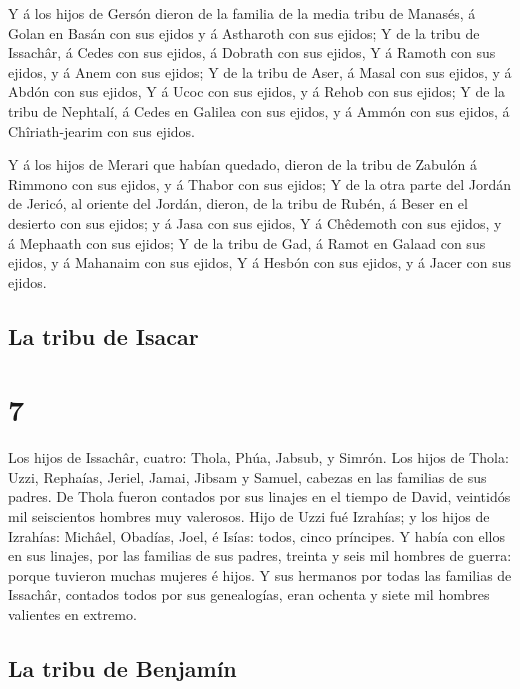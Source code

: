  Y á los hijos de Gersón dieron de la familia de la media
tribu de Manasés, á Golan en Basán con sus ejidos y á Astharoth con sus
ejidos;  Y de la tribu de Issachâr, á Cedes con sus
ejidos, á Dobrath con sus ejidos,  Y á Ramoth con sus
ejidos, y á Anem con sus ejidos;  Y de la tribu de Aser,
á Masal con sus ejidos, y á Abdón con sus ejidos,  Y á
Ucoc con sus ejidos, y á Rehob con sus ejidos;  Y de la
tribu de Nephtalí, á Cedes en Galilea con sus ejidos, y á Ammón con sus
ejidos, á Chîriath-jearim con sus ejidos.

 Y á los hijos de Merari que habían quedado, dieron de la
tribu de Zabulón á Rimmono con sus ejidos, y á Thabor con sus ejidos;
 Y de la otra parte del Jordán de Jericó, al oriente del
Jordán, dieron, de la tribu de Rubén, á Beser en el desierto con sus
ejidos; y á Jasa con sus ejidos,  Y á Chêdemoth con sus
ejidos, y á Mephaath con sus ejidos;  Y de la tribu de
Gad, á Ramot en Galaad con sus ejidos, y á Mahanaim con sus ejidos,
 Y á Hesbón con sus ejidos, y á Jacer con sus ejidos.

\hypertarget{la-tribu-de-isacar}{%
\subsection{La tribu de Isacar}\label{la-tribu-de-isacar}}

\hypertarget{section-6}{%
\section{7}\label{section-6}}

 Los hijos de Issachâr, cuatro: Thola, Phúa, Jabsub, y
Simrón.  Los hijos de Thola: Uzzi, Rephaías, Jeriel,
Jamai, Jibsam y Samuel, cabezas en las familias de sus padres. De Thola
fueron contados por sus linajes en el tiempo de David, veintidós mil
seiscientos hombres muy valerosos.  Hijo de Uzzi fué
Izrahías; y los hijos de Izrahías: Michâel, Obadías, Joel, é Isías:
todos, cinco príncipes.  Y había con ellos en sus linajes,
por las familias de sus padres, treinta y seis mil hombres de guerra:
porque tuvieron muchas mujeres é hijos.  Y sus hermanos
por todas las familias de Issachâr, contados todos por sus genealogías,
eran ochenta y siete mil hombres valientes en extremo.

\hypertarget{la-tribu-de-benjamuxedn}{%
\subsection{La tribu de Benjamín}\label{la-tribu-de-benjamuxedn}}

